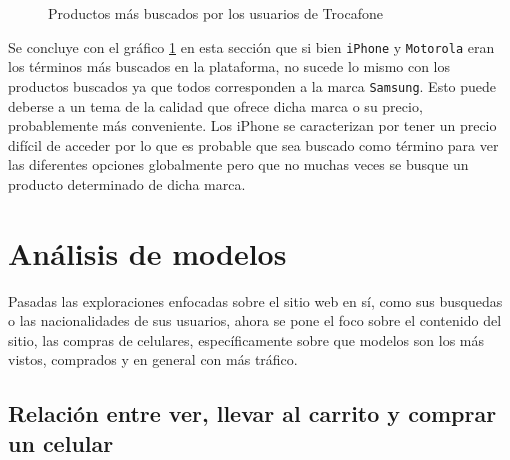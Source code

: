\documentclass[a4paper]{article}
\begin{document}
\begin{figure}[h!]
	\caption{Productos más buscados por los usuarios de Trocafone}
	\label{fig:searchedproduct}
\end{figure}

Se concluye con el gráfico \ref{fig:searchedproduct} en esta sección que si bien \texttt{iPhone} y \texttt{Motorola} eran los términos más buscados en la plataforma, no sucede lo mismo con los productos buscados ya que todos corresponden a la marca \texttt{Samsung}. Esto puede deberse a un tema de la calidad que ofrece dicha marca o su precio, probablemente más conveniente. Los iPhone se caracterizan por tener un precio difícil de acceder por lo que es probable que sea buscado como término para ver las diferentes opciones globalmente pero que no muchas veces se busque un producto determinado de dicha marca.

\section{Análisis de modelos} \label{modelo}

Pasadas las exploraciones enfocadas sobre el sitio web en sí, como sus busquedas o las nacionalidades de sus usuarios, ahora se pone el foco sobre el contenido del sitio, las compras de celulares, específicamente sobre que modelos son los más vistos, comprados y en general con más tráfico.

\subsection{Relación entre ver, llevar al carrito y comprar un celular}
\end{document}
